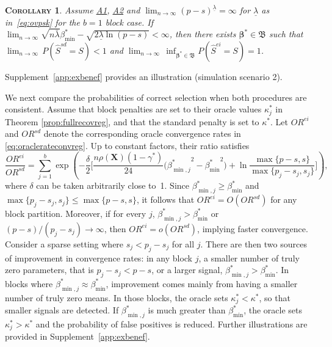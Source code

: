 \documentclass[
  12pt]{article}
\newcommand{\bbeta}{\boldsymbol{\beta}}
\newcommand{\bX}{\mathbf{X}}
\newtheorem{cor}[thm]{\textsc{Corollary}}
\begin{document}
\begin{cor}\label{cor:selconstimpossiblereg}
Assume \hyperlink{lab:A1}{A1}, \hyperlink{lab:A2}{A2} and $\lim_{n\to\infty}(p-s)^{\underline{\lambda}}=\infty$ for $\underline{\lambda}$ as in~\eqref{eq:ovpsk} for the $b=1$ block case. If
$\lim_{n\to\infty}\sqrt{n\bar{\lambda}}\beta_{\min}^*-\sqrt{2\underline{\lambda}\ln(p-s)}< \infty$,
then there exists $\bbeta^*\in\mathfrak{B}$ such that
$\lim_{n \to \infty} \, P(\hat{S}^{sd} = S) < 1$ and $\lim_{n \to \infty} \, \inf_{\bbeta^*\in\mathfrak{B}}P(\hat{S}^{ei} = S) = 1$.
\end{cor}
Supplement~\ref{app:exbenef} provides an illustration (simulation scenario 2).

We next compare the probabilities of correct selection when both procedures are consistent. Assume that block penalties are set to their oracle values $\kappa_j^*$ in Theorem \ref{prop:fullrecovreg}, and that the standard penalty is set to $\kappa^*$. Let $OR^{ei}$ and $OR^{sd}$ denote the corresponding oracle convergence rates in \eqref{eq:oraclerateconvreg}. Up to constant factors, their ratio satisfies
\begin{equation}\label{eq:fewkn}
\frac{OR^{ei}}{OR^{sd}}
=
\sum_{j=1}^b
\exp\!\left(
-\frac{\delta}{2}
\Big[
\frac{n\rho(\bX)(1-\gamma^*)}{24}
\big({\beta^*_{\min,j}}^2-{\beta_{\min}^*}^2\big)
+
\ln\!\frac{\max\{p-s,s\}}{\max\{p_j-s_j,s_j\}}
\Big]
\right),
\end{equation}
where $\delta$ can be taken arbitrarily close to~1.  Since $\beta^*_{\min,j}\ge\beta^*_{\min}$ and $\max\{p_j-s_j,s_j\}\le\max\{p-s,s\}$, it follows that $OR^{ei}=O(OR^{sd})$ for any block partition.
Moreover, if for every $j$, $\beta^*_{\min,j}>\beta^*_{\min}$ or $(p-s) / (p_j - s_j) \to \infty$, then $OR^{ei}=o(OR^{sd})$, implying faster convergence. Consider a sparse setting where $s_j < p_j - s_j$ for all $j$. There are then two sources of improvement in convergence rates: in any block $j$, a smaller number of truly zero parameters, that is $p_j-s_j< p-s$, or a larger signal, $\beta^*_{\min,j} > \beta_{\min}^*$. In blocks where $\beta^*_{\min,j} \approx \beta_{\min}^*$, improvement comes mainly from having a smaller number of truly zero means. In those blocks,
the oracle sets $\kappa^*_j < \kappa^*$, so that smaller signals are detected. If $\beta^*_{\min,j}$ is much greater than $\beta_{\min}^*$, the oracle sets $\kappa^*_j > \kappa^*$ and the probability of false positives is reduced. Further illustrations are provided in Supplement~\ref{app:exbenef}.
\end{document}
